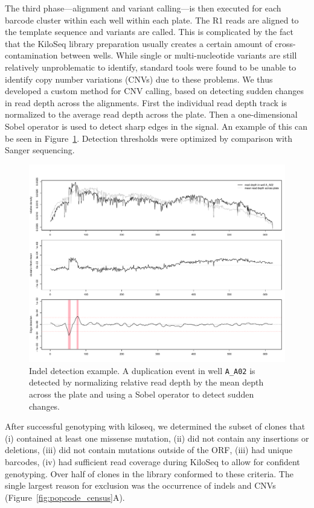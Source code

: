 The third phase---alignment and variant calling---is then executed for each barcode cluster within each well within each plate. The R1 reads are aligned to the template sequence and variants are called. This is complicated by the fact that the KiloSeq library preparation usually creates a certain amount of cross-contamination between wells. While single or multi-nucleotide variants are still relatively unproblematic to identify, standard tools were found to be unable to identify copy number variations (CNVs) due to these problems. We thus developed a custom method for CNV calling, based on detecting sudden changes in read depth across the alignments. First the individual read depth track is normalized to the average read depth across the plate. Then a one-dimensional Sobel operator is used to detect sharp edges in the signal. An example of this can be seen in Figure~\ref{fig:border_detect}. Detection thresholds were optimized by comparison with Sanger sequencing.

\begin{figure}[h!]
	\centering
	\includegraphics[width=\textwidth]{img/border_detect.pdf}
	\caption{Indel detection example. A duplication event in well \texttt{A\_A02} is detected by normalizing relative read depth by the mean depth across the plate and using a Sobel operator to detect sudden changes.}
	\label{fig:border_detect}
\end{figure}


After successful genotyping with kiloseq, we determined the subset of clones that (i) contained at least one missense mutation, (ii) did not contain any insertions or deletions, (iii) did not contain mutations outside of the ORF, (iii) had unique barcodes, (iv) had sufficient read coverage during KiloSeq to allow for confident genotyping.
Over half of clones in the library conformed to these criteria. The single largest reason for exclusion was the occurrence of indels and CNVs (Figure~\ref{fig:popcode_census}A). 

